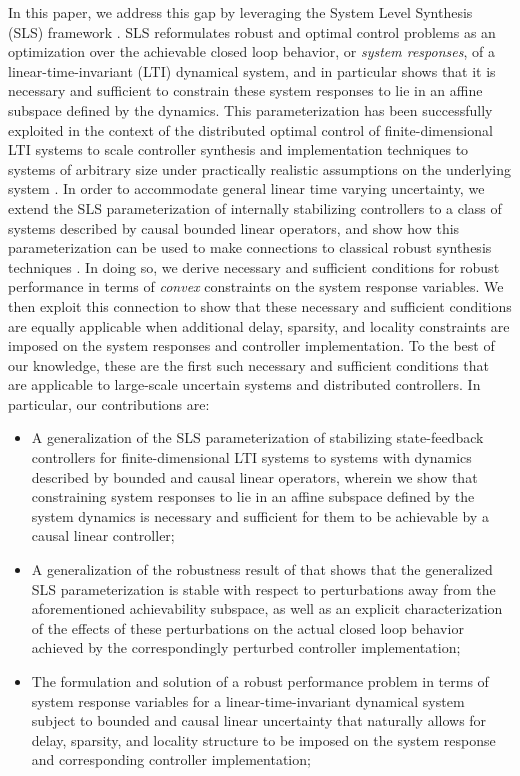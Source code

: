 In this paper, we address this gap by leveraging the System Level Synthesis (SLS)  framework \cite{anderson2019system,wang2019system}.  SLS reformulates robust and optimal control problems as an optimization over the achievable closed loop behavior, or \emph{system responses}, of a linear-time-invariant (LTI) dynamical system, and in particular shows that it is necessary and sufficient to constrain these system responses to lie in an affine subspace defined by the dynamics.  This parameterization has been successfully exploited in the context of the distributed optimal control of finite-dimensional LTI systems to scale controller synthesis and implementation techniques to systems of arbitrary size under practically realistic assumptions on the underlying system \cite{wang2014localized, wang2016localized,wang2018separable}.  In order to accommodate general linear time varying uncertainty, we extend the SLS parameterization of internally stabilizing controllers to a class of systems described by causal bounded linear operators, and show how this parameterization can be used to make connections to classical robust synthesis techniques \cite{khammash1990stability,dahleh1994control}.  In doing so, we derive necessary and sufficient conditions for robust performance in terms of \emph{convex} constraints on the system response variables.  We then exploit this connection to show that these necessary and sufficient conditions are equally applicable when additional delay, sparsity, and locality constraints are imposed on the system responses and controller implementation.  To the best of our knowledge, these are the first such necessary and sufficient conditions that are applicable to large-scale uncertain systems and distributed controllers.  In particular, our contributions are:
\begin{itemize}
\item A generalization of the SLS parameterization of stabilizing state-feedback controllers for finite-dimensional LTI systems \cite{wang2019system} to systems with dynamics described by bounded and causal linear operators, wherein we show that constraining system responses to lie in an affine subspace defined by the system dynamics is necessary and sufficient for them to be achievable by a causal linear controller;
\item A generalization of the robustness result of \cite{matni2017scalable} that shows that the  generalized SLS parameterization is stable with respect to perturbations away from the aforementioned achievability subspace, as well as an explicit characterization of the effects of these perturbations on the actual closed loop behavior achieved by the correspondingly perturbed controller implementation;
\item The formulation and solution of a robust performance problem in terms of system response variables for a linear-time-invariant dynamical system subject to bounded and causal linear uncertainty that naturally allows for delay, sparsity, and locality structure to be imposed on the system response and corresponding controller implementation;
\end{itemize}

